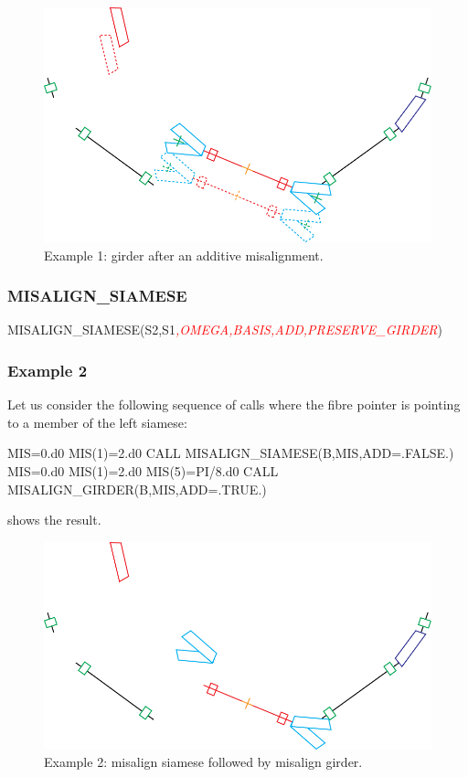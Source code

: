 \begin{figure}[ht]
  \centering
  \includegraphics[width=.9\textwidth]{illustrations/misalign-fig3}
  \caption{Example 1: girder after an additive misalignment.}
  \label{fig:Example-1-2}
\end{figure}


\subsubsection{MISALIGN\_SIAMESE}

%
\begin{ptccode}
MISALIGN_SIAMESE(S2,S1\textit{\textcolor{red}{,OMEGA,BASIS,ADD,PRESERVE_GIRDER}})
\end{ptccode}


\subsubsection*{Example 2}

Let us consider the following sequence of calls where the fibre pointer
 is pointing to a member of the left siamese:

\begin{ptccode}
MIS=0.d0
MIS(1)=2.d0
CALL MISALIGN_SIAMESE(B,MIS,ADD=.FALSE.)
MIS=0.d0
MIS(1)=2.d0
MIS(5)=PI/8.d0
CALL MISALIGN_GIRDER(B,MIS,ADD=.TRUE.)
\end{ptccode}

 shows the result.

\begin{figure}[ht]\forceversofloat
  \centering
  \includegraphics[width=.9\textwidth]{illustrations/misalign-fig4}
  \caption{Example 2: misalign siamese followed by misalign girder.}
  \label{fig:Example-2}
\end{figure}


